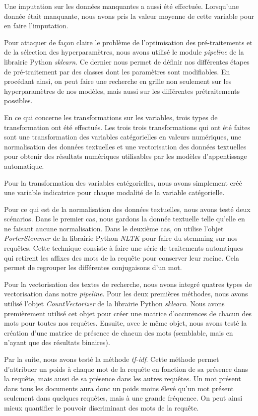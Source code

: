 Une imputation sur les données manquantes a aussi été effectuée. Lorsqu'une donnée était manquante, nous avons pris la valeur moyenne de cette variable pour en faire l'imputation.

Pour attaquer de façon claire le problème de l'optimisation des pré-traitements et de la sélection des hyperparamètres, nous avons utilisé le module \emph{pipeline} de la librairie Python \emph{sklearn}. Ce dernier nous permet de définir nos différentes étapes de pré-traitement par des classes dont les paramètres sont modifiables. En procédant ainsi, on peut faire une recherche en grille non seulement sur les hyperparamètres de nos modèles, mais aussi sur les différentes prétraitements possibles.
\break

En ce qui concerne les transformations sur les variables, trois types de transformation ont été effectués.
Les trois trois transformations qui ont été faites sont une transformation des variables catégorielles en valeurs numériques, une normalisation des données textuelles et une vectorisation des données textuelles pour obtenir des résultats numériques utilisables par les modèles d'appentissage automatique.

Pour la transformation des variables catégorielles, nous avons simplement créé une variable indicatrice pour chaque modalité de la variable catégorielle.

Pour ce qui est de la normalisation des données textuelles, nous avons testé deux scénarios.
Dans le premier cas, nous gardons la donnée textuelle telle qu'elle en ne faisant aucune normalisation.
Dans le deuxième cas, on utilise l'objet \emph{PorterStemmer} de la librairie Python \emph{NLTK} pour faire du stemming sur nos requêtes.
Cette technique consiste à faire une série de traitements automtiques qui retirent les affixes des mots de la requête pour conserver leur racine. 
Cela permet de regrouper les différentes conjugaisons d'un mot.

Pour la vectorisation des textes de recherche, nous avons integré quatres types de vectorisation dans notre \textit{pipeline}.
Pour les deux premières méthodes, nous avons utilisé l'objet \textit{CountVectorizer} de la librairie Python \textit{sklearn}. 
Nous avons premièrement utilisé cet objet pour créer une matrice d'occurences de chacun des mots pour toutes nos requêtes.
Ensuite, avec le même objet, nous avons testé la création d'une matrice de présence de chacun des mots (semblable, mais en n'ayant que des résultats binaires).

Par la suite, nous avons testé la méthode \textit{tf-idf}. 
Cette méthode permet d'attribuer un poids à chaque mot de la requête en fonction de sa présence dans la requête, mais aussi de sa présence dans les autres requêtes. Un mot présent dans tous les documents aura donc un poids moins élevé qu'un mot présent seulement dans quelques requêtes, mais à une grande fréquence. On peut ainsi mieux quantifier le pouvoir discriminant des mots de la requête.

